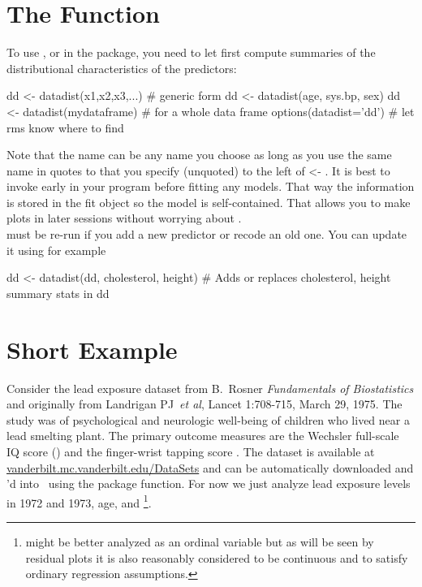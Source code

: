 \section{The   Function}%
\ipacue
To use , or  in the 
  package, you need to let  first compute summaries of the
  distributional characteristics of the predictors:
\begin{Schunk}
\begin{Sinput}
dd <- datadist(x1,x2,x3,...)   # generic form
dd <- datadist(age, sys.bp, sex)
dd <- datadist(mydataframe)    # for a whole data frame
options(datadist='dd')         # let rms know where to find
\end{Sinput}
\end{Schunk}
Note that the name  can be any name you choose as long as you
use the same name in quotes to  that you specify
(unquoted) to the left of <- .  It is best to
invoke  early in your program before fitting any
models.  That way the  information is stored in the fit
  object so the model is self-contained.  That allows you to make
  plots in later sessions without worrying about .  \\
 must be re-run if you add a new predictor or recode an
old one.  You can update it using for example
\begin{Schunk}
\begin{Sinput}
dd <- datadist(dd, cholesterol, height)
# Adds or replaces cholesterol, height summary stats in dd
\end{Sinput}
\end{Schunk}

\section{Short Example}\ipacue{}
Consider the lead exposure dataset from B.\ Rosner \emph{Fundamentals
  of Biostatistics} and originally from Landrigan PJ~\emph{et al}, Lancet
1:708-715, March 29, 1975.  The study was of psychological and
neurologic well-being of children who lived near a lead smelting
plant.  The primary outcome measures are the Wechsler full-scale IQ
score () and the finger-wrist tapping score .  The
dataset is available at \url{vanderbilt.mc.vanderbilt.edu/DataSets}
and can be automatically downloaded and 'd into \R\ using
the  package  function.  For now we just
analyze lead exposure levels in 1972 and 1973, age, and
\footnote{ might be better analyzed as an
  ordinal variable but as will be seen by residual plots it is also
  reasonably considered to be continuous and to satisfy ordinary
  regression assumptions.}.

